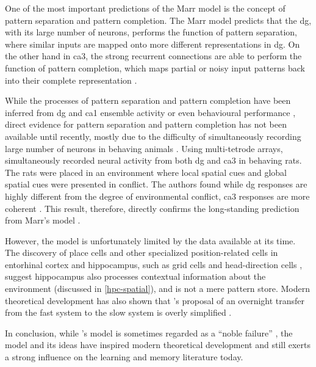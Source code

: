 One of the most important predictions of the Marr model \citep{marr71} is the concept of pattern separation and pattern completion. The Marr model predicts that the \gls{dg}, with its large number of neurons, performs the function of pattern separation, where similar inputs are mapped onto more different representations in \gls{dg}. On the other hand in \gls{ca3}, the strong recurrent connections are able to perform the function of pattern completion, which maps partial or noisy input patterns back into their complete representation \citep{rolls13, knierim16}. 

While the processes of pattern separation and pattern completion have been inferred from \gls{dg} and \gls{ca1} ensemble activity or even behavioural performance \citep{santoro13, rolls13}, direct evidence for  pattern separation and pattern completion has not been available until recently, mostly due to the difficulty of simultaneously recording large number of neurons in behaving animals \citep{knierim16}. Using multi-tetrode arrays, \citet{neunuebel14} simultaneously recorded neural activity from both \gls{dg} and \gls{ca3} in behaving rats. The rats were placed in an environment where local spatial cues and global spatial cues were presented in conflict. The authors found while \gls{dg} responses are highly different from the degree of environmental conflict, \gls{ca3} responses are more coherent \citep{neunuebel14}. This result, therefore, directly confirms the long-standing prediction from Marr's model \citep{rolls13, knierim16}. 

However, the \citet{marr71} model is unfortunately limited by the data available at its time. The discovery of place cells \citep{o'keefe71} and other specialized position-related cells in entorhinal cortex and hippocampus, such as grid cells and head-direction cells \citep{taube90, fyhn04, hafting05}, suggest hippocampus also processes contextual information about the environment (discussed in \ref{hpc-spatial}), and is not a mere pattern store. Modern theoretical development has also shown that \citet{marr71}'s proposal of an overnight transfer from the fast system to the slow system is overly simplified \citep{squire09}. 

In conclusion, while \citet{marr71}'s model is sometimes regarded as a ``noble failure'' \citep{willshaw15}, the model and its ideas have inspired modern theoretical development and still exerts a strong influence on the learning and memory literature today. 


